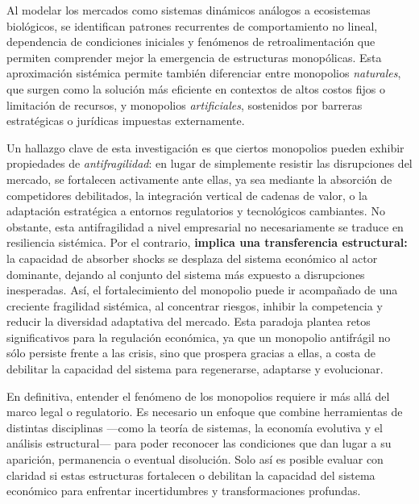 \documentclass[a4paper,12pt]{article}
\begin{document}
Al modelar los mercados como sistemas dinámicos análogos a ecosistemas biológicos, se identifican patrones recurrentes de comportamiento no lineal, dependencia de condiciones iniciales y fenómenos de retroalimentación que permiten comprender mejor la emergencia de estructuras monopólicas. Esta aproximación sistémica permite también diferenciar entre monopolios \textit{naturales}, que surgen como la solución más eficiente en contextos de altos costos fijos o limitación de recursos, y monopolios \textit{artificiales}, sostenidos por barreras estratégicas o jurídicas impuestas externamente.

Un hallazgo clave de esta investigación es que ciertos monopolios pueden exhibir propiedades de \textit{antifragilidad}: en lugar de simplemente resistir las disrupciones del mercado, se fortalecen activamente ante ellas, ya sea mediante la absorción de competidores debilitados, la integración vertical de cadenas de valor, o la adaptación estratégica a entornos regulatorios y tecnológicos cambiantes. No obstante, esta antifragilidad a nivel empresarial no necesariamente se traduce en resiliencia sistémica. Por el contrario, \textbf{implica una transferencia estructural:} la capacidad de absorber shocks se desplaza del sistema económico al actor dominante, dejando al conjunto del sistema más expuesto a disrupciones inesperadas. Así, el fortalecimiento del monopolio puede ir acompañado de una creciente fragilidad sistémica, al concentrar riesgos, inhibir la competencia y reducir la diversidad adaptativa del mercado. Esta paradoja plantea retos significativos para la regulación económica, ya que un monopolio antifrágil no sólo persiste frente a las crisis, sino que prospera gracias a ellas, a costa de debilitar la capacidad del sistema para regenerarse, adaptarse y evolucionar.

En definitiva, entender el fenómeno de los monopolios requiere ir más allá del marco legal o regulatorio. Es necesario un enfoque que combine herramientas de distintas disciplinas —como la teoría de sistemas, la economía evolutiva y el análisis estructural— para poder reconocer las condiciones que dan lugar a su aparición, permanencia o eventual disolución. Solo así es posible evaluar con claridad si estas estructuras fortalecen o debilitan la capacidad del sistema económico para enfrentar incertidumbres y transformaciones profundas.
\end{document}
